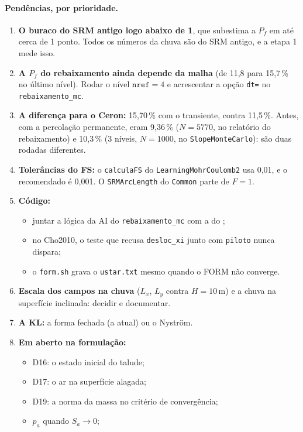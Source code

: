 \paragraph{Pendências, por prioridade.}
\begin{enumerate}
  \item \textbf{O buraco do SRM antigo logo abaixo de 1}, que subestima a $P_f$ em até cerca de 1 ponto. Todos os números
    da chuva são do SRM antigo, e a etapa 1 mede isso.
  \item \textbf{A $P_f$ do rebaixamento ainda depende da malha} (de 11,8 para 15,7\,\% no último nível). Rodar o nível
    $\texttt{nref} = 4$ e acrescentar a opção \texttt{dt=} no \texttt{rebaixamento\_mc}.
  \item \textbf{A diferença para o Ceron:} 15,70\,\% com o transiente, contra 11,5\,\%. Antes, com a percolação
    permanente, eram 9,36\,\% ($N = 5770$, no relatório do rebaixamento) e 10,3\,\% (3 níveis, $N = 1000$, no
    \texttt{SlopeMonteCarlo}): são duas rodadas diferentes.
  \item \textbf{Tolerâncias do FS:} o \texttt{calculaFS} do \texttt{LearningMohrCoulomb2} usa 0,01, e o recomendado é
    0,001. O \texttt{SRMArcLength} do \texttt{Common} parte de $F = 1$.
  \item \textbf{Código:}
    \begin{itemize}
      \item juntar a lógica da AI do \texttt{rebaixamento\_mc} com a do ;
      \item no Cho2010, o teste que recusa \texttt{desloc\_xi} junto com \texttt{piloto} nunca dispara;
      \item o \texttt{form.sh} grava o \texttt{ustar.txt} mesmo quando o FORM não converge.
    \end{itemize}
  \item \textbf{Escala dos campos na chuva} ($L_x$, $L_y$ contra $H = 10$\,m) e a chuva na superfície inclinada:
    decidir e documentar.
  \item \textbf{A KL:} a forma fechada (a atual) ou o Nyström.
  \item \textbf{Em aberto na formulação:}
    \begin{itemize}
      \item D16: o estado inicial do talude;
      \item D17: o ar na superfície alagada;
      \item D19: a norma da massa no critério de convergência;
      \item $p_a$ quando $S_a \to 0$;

\end{itemize}
\end{enumerate}
